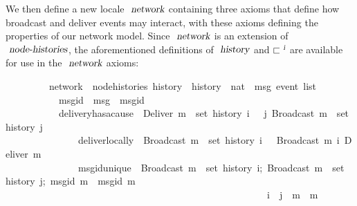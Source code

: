 We then define a new locale $\isa{network}$ containing three axioms that define how broadcast and deliver events may interact, with these axioms defining the properties of our network model.
Since $\isa{network}$ is an extension of $\isa{node-histories}$, the aforementioned definitions of $\isa{history}$ and $\sqsubset^\isa{i}$ are available for use in the $\isa{network}$ axioms:
\vspace{0.25em}
\begin{isabellebody}
\ \ \ \ \ \ \ \ \ network\ {\isacharequal}\ node{\isacharunderscore}histories\ history\ \ history\ {\isacharcolon}{\isacharcolon}\ {\isachardoublequoteopen}nat\ {\isasymRightarrow}\ {\isacharprime}msg\ event\ list{\isachardoublequoteclose}\ {\isacharplus}\isanewline
\ \ \ \ \ \ \ \ \ \ \ msg{\isacharunderscore}id\ {\isacharcolon}{\isacharcolon}\ {\isachardoublequoteopen}{\isacharprime}msg\ {\isasymRightarrow}\ {\isacharprime}msgid{\isachardoublequoteclose}\isanewline
\ \ \ \ \ \ \ \ \ \ \ delivery{\isacharunderscore}has{\isacharunderscore}a{\isacharunderscore}cause{\isacharcolon}\ {\isasymlbrakk}\ {\isachardoublequoteopen}Deliver\ m\ {\isasymin}\ set\ {\isacharparenleft}history\ i{\isacharparenright}\ {\isasymrbrakk}\ {\isasymLongrightarrow}\ {\isasymexists}j{\isachardot}\ Broadcast\ m\ {\isasymin}\ set\ {\isacharparenleft}history\ j{\isacharparenright}{\isachardoublequoteclose}\isanewline
\ \ \ \ \ \ \ \ \ \ \ \ \ \ \ deliver{\isacharunderscore}locally{\isacharcolon}\ {\isasymlbrakk}\ {\isachardoublequoteopen}Broadcast\ m\ {\isasymin}\ set\ {\isacharparenleft}history\ i{\isacharparenright}\ {\isasymrbrakk}\ {\isasymLongrightarrow}\  Broadcast\ m\ {\isasymsqsubset}\isactrlsup i\ Deliver\ m{\isachardoublequoteclose}\isanewline
\ \ \ \ \ \ \ \ \ \ \ \ \ \ \ msg{\isacharunderscore}id{\isacharunderscore}unique{\isacharcolon}\ {\isasymlbrakk}\ {\isachardoublequoteopen}Broadcast\ m{}\ {\isasymin}\ set\ {\isacharparenleft}history\ i{\isacharparenright};\ Broadcast\ m{}\ {\isasymin}\ set\ {\isacharparenleft}history\ j{\isacharparenright};\ msg{\isacharunderscore}id\ m{}\ {\isacharequal}\ msg{\isacharunderscore}id\ m{}\ {\isasymrbrakk}\isanewline
\ \ \ \ \ \ \ \ \ \ \ \ \ \ \ \ \ \ \ \ \ \ \ \ \ \ \ \ \ \ \ \ \ \ \ \ \ \ \ \ \ \ \ \ \ \ \ \ \ \ \ \ \ {\isasymLongrightarrow}\ i\ {\isacharequal}\ j\ {\isasymand}\ m{}\ {\isacharequal}\ m{}{\isachardoublequoteclose}
\end{isabellebody}

